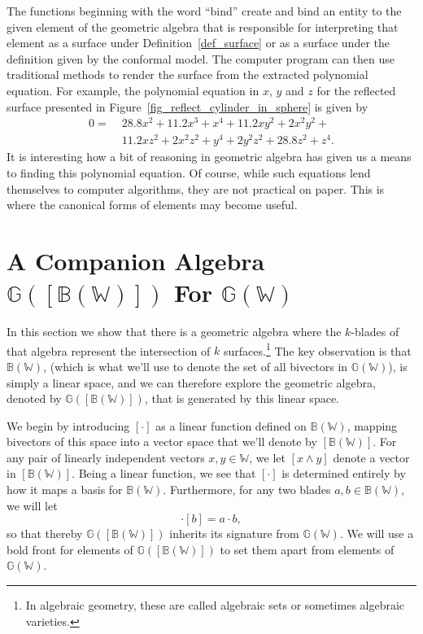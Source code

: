 \documentclass{birkjour}
\theoremstyle{definition}
\theoremstyle{remark}
\numberwithin{equation}{section}
\newcommand{\G}{\mathbb{G}}
\newcommand{\W}{\mathbb{W}}
\newcommand{\B}{\mathbb{B}}
\begin{document}
The functions beginning with the word ``bind'' create and bind an entity to the given
element of the geometric algebra that is responsible for interpreting that element
as a surface under Definition~\ref{def_surface} or as a surface under the definition
given by the conformal model.  The computer program can then
use traditional methods to render the surface from the extracted polynomial equation.
For example, the polynomial equation in $x$, $y$ and $z$ for the reflected surface presented
in Figure~\ref{fig_reflect_cylinder_in_sphere} is given by
\begin{equation}
\begin{split}
0 =\;& 28.8x^{2} + 11.2x^{3} + x^{4} + 11.2xy^{2} + 2x^{2}y^{2} + \\
 & 11.2xz^{2} + 2x^{2}z^{2} + y^{4} + 2y^{2}z^{2} + 28.8z^{2} + z^{4}.
\end{split}
\end{equation}
It is interesting how a bit of reasoning in geometric algebra has given us a means
to finding this polynomial equation.
Of course, while such equations lend themselves to computer algorithms, they
are not practical on paper.  This is where the canonical forms of elements may become
useful.

\section{A Companion Algebra $\G([\B(\W)])$ For $\G(\W)$}

In this section we show that there is a geometric algebra where
the $k$-blades of that algebra represent the intersection of $k$ surfaces.\footnote{In
algebraic geometry, these are called algebraic sets or sometimes algebraic varieties.}
The key observation is that $\B(\W)$, (which is what we'll use to denote the set
of all bivectors in $\G(\W)$), is simply a linear space, and we can therefore
explore the geometric algebra, denoted by $\G([\B(\W)])$, that is generated by this linear space.

We begin by introducing $[\cdot]$ as a linear function defined on $\B(\W)$, mapping bivectors
of this space into a vector space that we'll denote by $[\B(\W)]$.  For any pair of linearly
independent vectors $x,y\in\W$, we let $[x\wedge y]$ denote a vector in $[\B(\W)]$.  Being a linear
function, we see that $[\cdot]$ is determined entirely by how it maps a basis for $\B(\W)$.
Furthermore, for any two blades $a,b\in\B(\W)$, we will let
\begin{equation}
[a]\cdot[b] = a\cdot b,
\end{equation}
so that thereby $\G([\B(\W)])$ inherits its signature from $\G(\W)$.  We will
use a bold front for elements of $\G([\B(\W)])$ to set them apart from
elements of $\G(\W)$.
\end{document}
